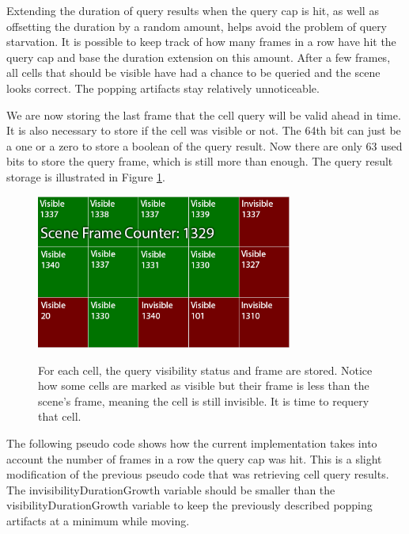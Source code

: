 \documentclass[12pt]{ucthesis}
\newcommand{\captionfonts}{\small\bf\ssp}
\begin{document}
Extending the duration of query results when the query cap is hit, as well as offsetting the duration by a random amount, helps avoid the problem of query starvation.
It is possible to keep track of how many frames in a row have hit the query cap and base the duration extension on this amount.
After a few frames, all cells that should be visible have had a chance to be queried and the scene looks correct.
The popping artifacts stay relatively unnoticeable.

We are now storing the last frame that the cell query will be valid ahead in time.
It is also necessary to store if the cell was visible or not.
The 64th bit can just be a one or a zero to store a boolean of the query result.
Now there are only 63 used bits to store the query frame, which is still more than enough.
The query result storage is illustrated in Figure \ref{fig:query-storage}.

\begin{figure}
\begin{center}
\includegraphics[width=0.75\textwidth]{Images/QueryStorage.png}
\captionfonts
\caption[Query Results Storage]{For each cell, the query visibility status and frame are stored.  Notice how some cells are marked as visible but their frame is less than the scene's frame, meaning the cell is still invisible.  It is time to requery that cell.}
\label{fig:query-storage}
\end{center}
\end{figure}

The following pseudo code shows how the current implementation takes into account the number of frames in a row the query cap was hit.
This is a slight modification of the previous pseudo code that was retrieving cell query results.
The invisibilityDurationGrowth variable should be smaller than the visibilityDurationGrowth variable to keep the previously described popping artifacts at a minimum while moving.
\end{document}
